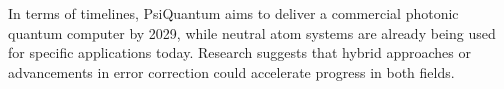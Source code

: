 \vspace{0.3cm}

In terms of timelines, PsiQuantum aims to deliver a commercial photonic
quantum computer by 2029, while neutral atom systems are already being used
for specific applications today. Research suggests that hybrid approaches or
advancements in error correction could accelerate progress in both fields.

\vspace{0.3cm}



